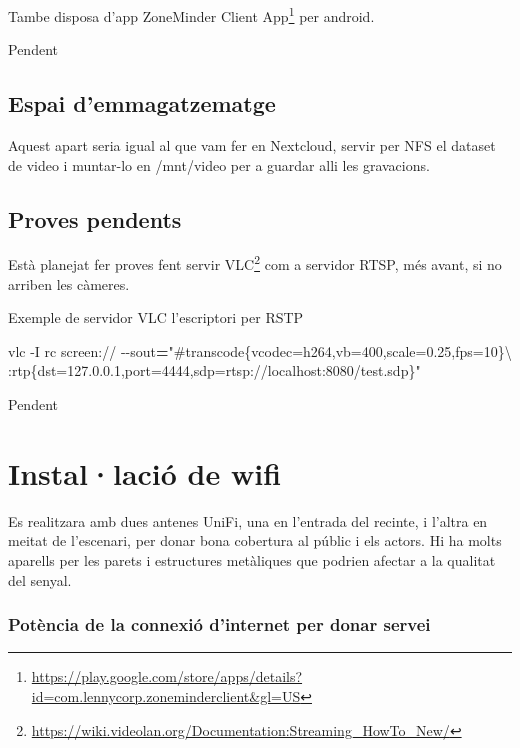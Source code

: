 \documentclass[
  10pt,
]{krantz}
\newenvironment{Shaded}{\begin{snugshade}}{\end{snugshade}}
\newcommand{\AttributeTok}[1]{\textcolor[rgb]{0.77,0.63,0.00}{#1}}
\newcommand{\DataTypeTok}[1]{\textcolor[rgb]{0.13,0.29,0.53}{#1}}
\newcommand{\ExtensionTok}[1]{#1}
\newcommand{\NormalTok}[1]{#1}
\newcommand{\OperatorTok}[1]{\textcolor[rgb]{0.81,0.36,0.00}{\textbf{#1}}}
\newcommand{\StringTok}[1]{\textcolor[rgb]{0.31,0.60,0.02}{#1}}
\DeclareRobustCommand{\href}[2]{#2\footnote{\url{#1}}}
\begin{document}
Tambe disposa d'app \href{https://play.google.com/store/apps/details?id=com.lennycorp.zoneminderclient\&gl=US}{ZoneMinder Client App} per android.

Pendent

\hypertarget{espai-demmagatzematge}{%
\section{Espai d'emmagatzematge}\label{espai-demmagatzematge}}

Aquest apart seria igual al que vam fer en Nextcloud, servir per NFS el dataset de video i muntar-lo en /mnt/video per a guardar alli les gravacions.

\hypertarget{proves-pendents}{%
\section{Proves pendents}\label{proves-pendents}}

Està planejat fer proves fent servir \href{https://wiki.videolan.org/Documentation:Streaming_HowTo_New/}{VLC} com a servidor RTSP, més avant, si no arriben les càmeres.

Exemple de servidor VLC l'escriptori per RSTP

\begin{Shaded}
\begin{Highlighting}[]
\ExtensionTok{vlc} \AttributeTok{{-}I}\NormalTok{ rc screen:// }\AttributeTok{{-}{-}sout}\OperatorTok{=}\StringTok{"\#transcode\{vcodec=h264,vb=400,scale=0.25,fps=10\}}\DataTypeTok{\textbackslash{}}
\StringTok{:rtp\{dst=127.0.0.1,port=4444,sdp=rtsp://localhost:8080/test.sdp\}"}
\end{Highlighting}
\end{Shaded}

Pendent

\hypertarget{installaciuxf3-de-wifi}{%
\chapter{Instal·lació de wifi}\label{installaciuxf3-de-wifi}}

Es realitzara amb dues antenes UniFi, una en l'entrada del recinte, i l'altra en meitat de l'escenari, per donar bona cobertura al públic i els actors. Hi ha molts aparells per les parets i estructures metàliques que podrien afectar a la qualitat del senyal.

\hypertarget{potuxe8ncia-de-la-connexiuxf3-dinternet-per-donar-servei}{%
\subsection{Potència de la connexió d'internet per donar servei}\label{potuxe8ncia-de-la-connexiuxf3-dinternet-per-donar-servei}}
\end{document}
